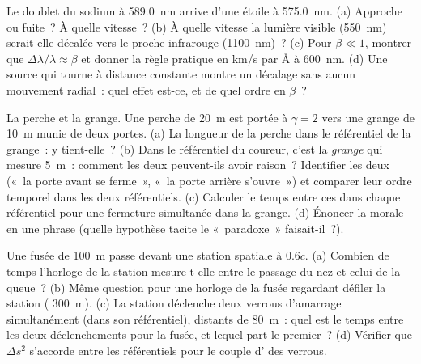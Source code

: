 \begin{exercise}[$\star\star$]\label{exo:b3:relativistic-kinematics:7}
Le doublet du sodium à \qty{589.0}{nm} arrive d'une étoile à
\qty{575.0}{nm}. (a) Approche ou fuite~? À quelle vitesse~? (b) À
quelle vitesse la lumière visible (\qty{550}{nm}) serait-elle décalée
vers le proche infrarouge (\qty{1100}{nm})~? (c) Pour $\beta \ll 1$,
montrer que $\Delta\lambda/\lambda \approx \beta$ et donner la règle
pratique en km/s par \unit{\angstrom} à \qty{600}{nm}. (d) Une source
qui tourne à distance constante montre un décalage sans aucun mouvement
radial~: quel effet est-ce, et de quel ordre en $\beta$~?
\end{exercise}

\begin{exercise}[$\star\star$]\label{exo:b3:relativistic-kinematics:8}
La perche et la grange. Une perche de \qty{20}{m} est portée à
$\gamma = 2$ vers une grange de \qty{10}{m} munie de deux portes. (a)
La longueur de la perche dans le référentiel de la grange~: y
tient-elle~? (b) Dans le référentiel du coureur, c'est la \emph{grange}
qui mesure \qty{5}{m}~: comment les deux peuvent-ils avoir raison~?
Identifier les deux  («~la porte avant se ferme~», «~la porte
arrière s'ouvre~») et comparer leur ordre temporel dans les deux
référentiels. (c) Calculer le temps entre ces  dans chaque
référentiel pour une fermeture simultanée dans la grange. (d) Énoncer
la morale en une phrase (quelle hypothèse tacite le «~paradoxe~»
faisait-il~?).
\end{exercise}

\begin{exercise}[$\star\star$]\label{exo:b3:relativistic-kinematics:9}
Une fusée de  \qty{100}{m} passe devant une station
spatiale à $0.6c$. (a) Combien de temps l'horloge de la station
mesure-t-elle entre le passage du nez et celui de la queue~? (b) Même
question pour une horloge de la fusée regardant défiler la station
( \qty{300}{m}). (c) La station déclenche deux
verrous d'amarrage simultanément (dans son référentiel), distants de
\qty{80}{m}~: quel est le temps entre les deux déclenchements pour la
fusée, et lequel part le premier~? (d) Vérifier que $\Delta s^2$
s'accorde entre les référentiels pour le couple d' des
verrous.
\end{exercise}

